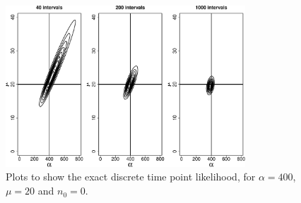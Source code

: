 \documentclass[11pt,BCOR2mm,DIV14]{scrartcl}
\begin{document}
\begin{figure}[h]
\centering
\includegraphics[width=0.8\textwidth]{graphs/likelihood_disc_2-crop}
\caption{Plots to show the exact discrete time point likelihood, for $\alpha =400$, $\mu=20$ and $n_0=0$.}\label{F1}
\end{figure}
\clearpage
\newpage
\end{document}

